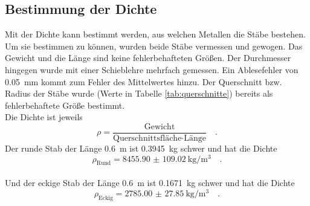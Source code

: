 \subsection{Bestimmung der Dichte}
Mit der Dichte kann bestimmt werden, aus welchen Metallen die Stäbe bestehen. Um sie bestimmen zu können, wurden beide Stäbe vermessen und gewogen. Das Gewicht und die Länge sind keine fehlerbehafteten Größen. Der Durchmesser hingegen wurde mit einer Schieblehre mehrfach gemessen. Ein Ablesefehler von \SI{0.05}{\milli\metre}  kommt zum Fehler des Mittelwertes hinzu.
Der Querschnitt bzw. Radius der Stäbe wurde (Werte in Tabelle \ref{tab:querschnitte}) bereits als fehlerbehaftete Größe bestimmt. \\
Die Dichte ist jeweils
\begin{equation}
  \rho = \frac{\text{Gewicht}}{\text{Querschnittsfläche} \cdot \text{Länge}} \quad.
\end{equation}
Der runde Stab der Länge \SI{0.6}{\metre} ist \SI{0.3945}{\kilo\gram} schwer und hat die Dichte
\begin{equation}
  \rho_\text{Rund} = \SI{8455.90(10902)}{\kilo\gram\per\cubic\metre} \quad.
\end{equation}  \\
Und der eckige Stab der Länge \SI{0.6}{\metre} ist \SI{0.1671}{\kilo\gram} schwer und hat die Dichte
\begin{equation}
  \rho_\text{Eckig} = \SI{2785.00(2785)}{\kilo\gram\per\cubic\metre} \quad.
\end{equation}
